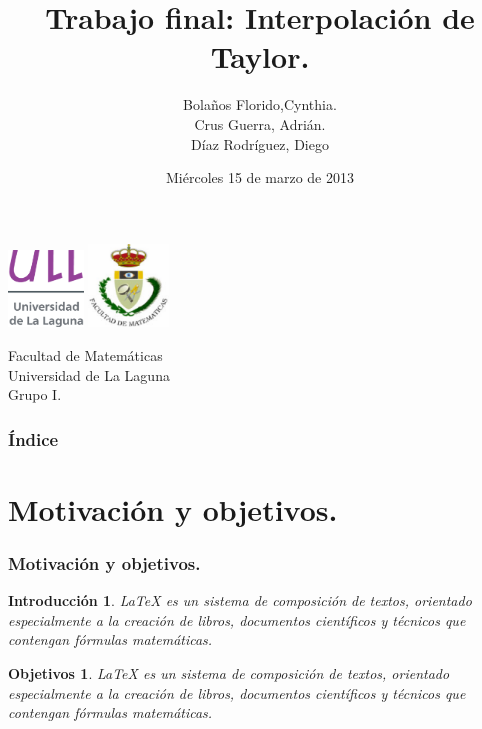 \documentclass{beamer}
\title[Presentación con Beamer]{Trabajo final: Interpolación de Taylor.}
\author[Técnicas Experimentales]{Bolaños Florido,Cynthia. \\
Crus Guerra, Adrián.\\
Díaz Rodríguez, Diego}
\date[15-05-2013]{Miércoles 15 de marzo de 2013}
\newtheorem{introduccion}{Introducción}
\newtheorem{objetivos}{Objetivos}
\begin{document}
\begin{frame}

\includegraphics[width=0.15\textwidth]{img/ullesc.eps}
\hspace*{7.5cm}
\includegraphics[width=0.16\textwidth]{img/fmatesc.eps}
\titlepage

  \begin{scriptsize}
    \begin{center}
     Facultad de Matemáticas \\
     Universidad de La Laguna \\
     Grupo I.
    \end{center}
  \end{scriptsize}
\end{frame}


\begin{frame}
  \frametitle{Índice}  
  \tableofcontents[pausesections]
\end{frame}


\section{Motivación y objetivos.}
\begin{frame}
\frametitle{Motivación y objetivos.}
\begin{introduccion}
\LaTeX{} es un sistema de composición de textos, orientado especialmente a la creación de libros, 
documentos científicos y técnicos que contengan fórmulas matemáticas. 
\end{introduccion}
\begin{objetivos}
\LaTeX{} es un sistema de composición de textos, orientado especialmente a la creación de libros, 
documentos científicos y técnicos que contengan fórmulas matemáticas. 
\end{objetivos}
\end{frame}
\end{document}
